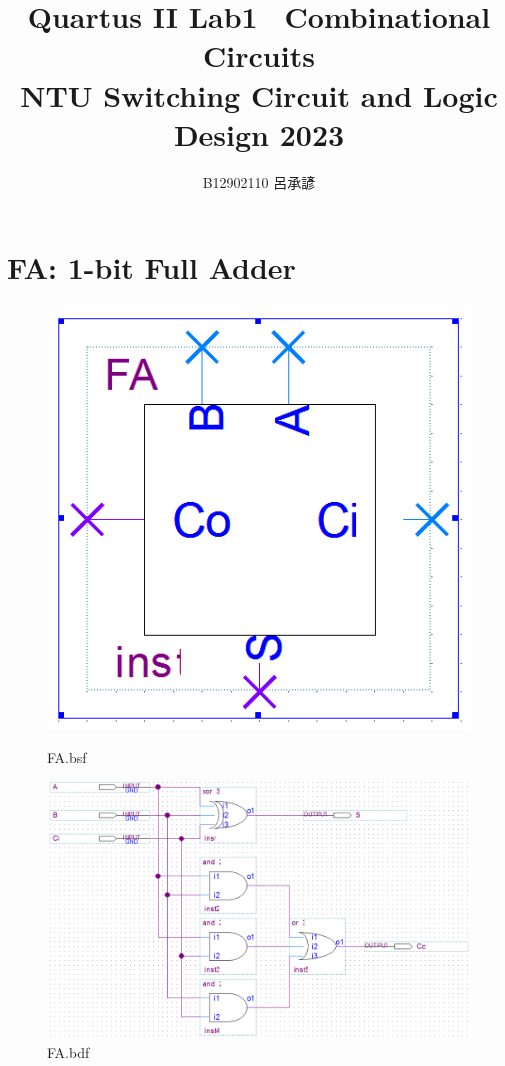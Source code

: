 \documentclass[12pt,a4paper]{article}
\title{
  Quartus II Lab1 \textemdash\ Combinational Circuits\\
  \large NTU Switching Circuit and Logic Design 2023
}
\author{B12902110 呂承諺}
\date{}
\begin{document}
  \maketitle
  \section{FA: 1-bit Full Adder}
  \begin{figure}[H]
    \centering
    \begin{subcaptionblock}{0.15\linewidth}
      \includegraphics[width=\linewidth]{FA_bsf.png}
      \caption{FA.bsf}
    \end{subcaptionblock}
    \begin{subcaptionblock}{0.84\linewidth}
      \includegraphics[width=\linewidth]{FA_bdf.png}
      \caption{FA.bdf}
    \end{subcaptionblock}
  \end{figure}
\end{document}
